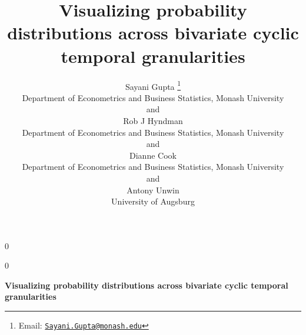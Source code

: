 \documentclass[12pt]{article}
\newcommand{\blind}{0}
\begin{document}
\def\spacingset#1{\renewcommand{\baselinestretch}%
{#1}\small\normalsize} \spacingset{1}



\blind
{
  \title{\bf Visualizing probability distributions across bivariate cyclic temporal granularities}

  \author{
        Sayani Gupta \thanks{Email: \href{mailto:Sayani.Gupta@monash.edu}{\nolinkurl{Sayani.Gupta@monash.edu}}} \\
    Department of Econometrics and Business Statistics, Monash University\\
     and \\     Rob J Hyndman \\
    Department of Econometrics and Business Statistics, Monash University\\
     and \\     Dianne Cook \\
    Department of Econometrics and Business Statistics, Monash University\\
     and \\     Antony Unwin \\
    University of Augsburg\\
      }
  \maketitle
} \fi

\blind
{
  \bigskip
  \bigskip
  \bigskip
  \begin{center}
    {\LARGE\bf Visualizing probability distributions across bivariate cyclic temporal granularities}
  \end{center}
  \medskip
} \fi
\end{document}

